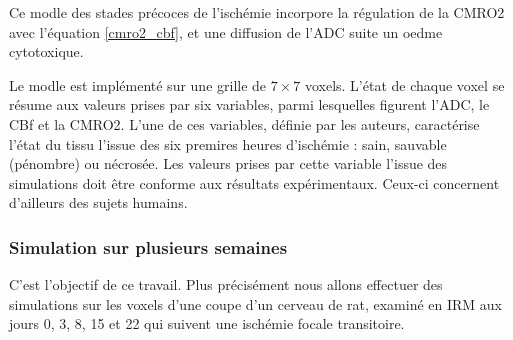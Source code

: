 \par
Ce modle des stades pr\'ecoces de l'isch\'emie incorpore la r\'egulation de la CMRO2 avec l'\'equation \ref{cmro2_cbf}, %
et une diffusion de l'ADC suite  un oedme cytotoxique.

\par
Le modle est impl\'ement\'e sur une grille de $7\times 7$ voxels. %
L'\'etat de chaque voxel se r\'esume aux valeurs prises par six variables, parmi lesquelles figurent l'ADC, le CBf et la CMRO2. %
L'une de ces variables, d\'efinie par les auteurs, caract\'erise l'\'etat du tissu  l'issue des six premires heures d'isch\'emie : %
sain, sauvable (p\'enombre) ou n\'ecros\'ee. Les valeurs prises par cette variable  l'issue des simulations doit \^etre conforme aux r\'esultats exp\'erimentaux. %
Ceux-ci concernent d'ailleurs des sujets humains.

\subsubsection{Simulation sur plusieurs semaines}

C'est l'objectif de ce travail. Plus pr\'ecis\'ement nous allons effectuer des simulations sur les voxels d'une coupe d'un cerveau de rat, %
examin\'e en IRM aux jours 0, 3, 8, 15 et 22 qui suivent une isch\'emie focale transitoire.
